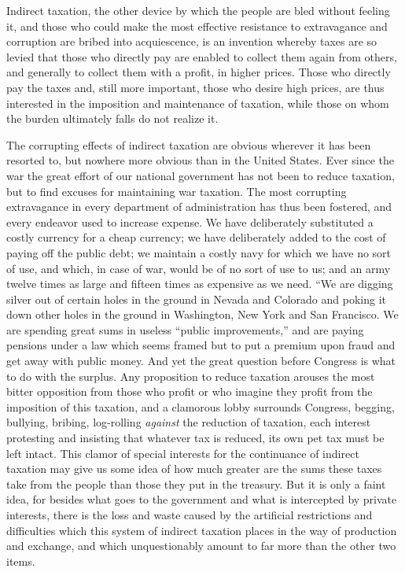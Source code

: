 \documentclass{book}
\begin{document}
Indirect taxation, the other device by which the people are bled without feeling it, and those who could make the most effective resistance to extravagance and corruption are bribed into acquiescence, is an invention whereby taxes are so levied that those who directly pay are enabled to collect them again from others, and generally to collect them with a profit, in higher prices. Those who directly pay the taxes and, still more important, those who desire high prices, are thus interested in the imposition and maintenance of taxation, while those on whom the burden ultimately falls do not realize it.

The corrupting effects of indirect taxation are obvious wherever it has been resorted to, but nowhere more obvious than in the United States. Ever since the war the great effort of our national government has not been to reduce taxation, but to find excuses for maintaining war taxation. The most corrupting extravagance in every department of administration has thus been fostered, and every endeavor used to increase expense. We have deliberately substituted a costly currency for a cheap currency; we have deliberately added to the cost of paying off the public debt; we maintain a costly navy for which we have no sort of use, and which, in case of war, would be of no sort of use to us; and an army twelve times as large and fifteen times as expensive as we need. “We are digging silver out of certain holes in the ground in Nevada and Colorado and poking it down other holes in the ground in Washington, New York and San Francisco. We are spending great sums in useless “public improvements,” and are paying pensions under a law which seems framed but to put a premium upon fraud and get away with public money. And yet the great question before Congress is what to do with the surplus. Any proposition to reduce taxation arouses the most bitter opposition from those who profit or who imagine they profit from the imposition of this taxation, and a clamorous lobby surrounds Congress, begging, bullying, bribing, log-rolling \emph{against} the reduction of taxation, each interest protesting and insisting that whatever tax is reduced, its own pet tax must be left intact. This clamor of special interests for the continuance of indirect taxation may give us some idea of how much greater are the sums these taxes take from the people than those they put in the treasury. But it is only a faint idea, for besides what goes to the government and what is intercepted by private interests, there is the loss and waste caused by the artificial restrictions and difficulties which this system of indirect taxation places in the way of production and exchange, and which unquestionably amount to far more than the other two items.
\end{document}
